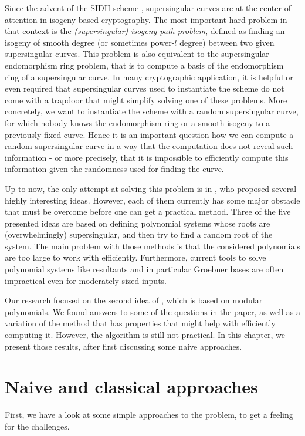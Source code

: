 
Since the advent of the SIDH scheme \cite{sidh}, supersingular curves are at the center of attention in isogeny-based cryptography.
The most important hard problem in that context is the \emph{(supersingular) isogeny path problem}, defined as finding an isogeny of smooth degree (or sometimes power-$l$ degree) between two given supersingular curves.
This problem is also equivalent \cite{endomorphism_ring_reductions} to the supersingular endomorphism ring problem, that is to compute a basis of the endomorphism ring of a supersingular curve.
In many cryptographic application, it is helpful or even required that supersingular curves used to instantiate the scheme do not come with a trapdoor that might simplify solving one of these problems.
More concretely, we want to instantiate the scheme with a random supersingular curve, for which nobody knows the endomorphism ring or a smooth isogeny to a previously fixed curve.
Hence it is an important question how we can compute a random supersingular curve in a way that the computation does not reveal such information - or more precisely, that it is impossible to efficiently compute this information given the randomness used for finding the curve. 

Up to now, the only attempt at solving this problem is in \cite{base_paper}, who proposed several highly interesting ideas.
However, each of them currently has some major obstacle that must be overcome before one can get a practical method.
Three of the five presented ideas are based on defining polynomial systems whose roots are (overwhelmingly) supersingular, and then try to find a random root of the system.
The main problem with those methods is that the considered polynomials are too large to work with efficiently.
Furthermore, current tools to solve polynomial systems like resultants and in particular Groebner bases are often impractical even for moderately sized inputs.

Our research focused on the second idea of \cite{base_paper}, which is based on modular polynomials.
We found answers to some of the questions in the paper, as well as a variation of the method that has properties that might help with efficiently computing it.
However, the algorithm is still not practical.
In this chapter, we present those results, after first discussing some naive approaches.

\section{Naive and classical approaches}
\label{prop:naive_classical_approaches}
First, we have a look at some simple approaches to the problem, to get a feeling for the challenges.

